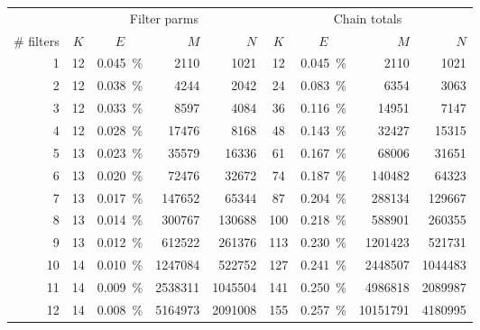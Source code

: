 \begin{tabular}{ r | c c r r | c c r r }
    \hline
    \rowcolor{blue!20}            & \multicolumn{4}{c}{Filter parms} & \multicolumn{4}{c}{Chain totals} \\
    \rowcolor{blue!20} \# filters & $K$ & $E$ & $M$ & $N$            & $K$ & $E$ & $M$ & $N$ \\
    \hline
    \rowcolor[gray]{0.925}
    \num{1} & \num{12} & \SI{0.045}{\%} & \num{2110} & \num{1021} & \num{12} & \SI{0.045}{\%} & \num{2110} & \num{1021} \\
    \num{2} & \num{12} & \SI{0.038}{\%} & \num{4244} & \num{2042} & \num{24} & \SI{0.083}{\%} & \num{6354} & \num{3063} \\
    \rowcolor[gray]{0.925}
    \num{3} & \num{12} & \SI{0.033}{\%} & \num{8597} & \num{4084} & \num{36} & \SI{0.116}{\%} & \num{14951} & \num{7147} \\
    \num{4} & \num{12} & \SI{0.028}{\%} & \num{17476} & \num{8168} & \num{48} & \SI{0.143}{\%} & \num{32427} & \num{15315} \\
    \rowcolor[gray]{0.925}
    \num{5} & \num{13} & \SI{0.023}{\%} & \num{35579} & \num{16336} & \num{61} & \SI{0.167}{\%} & \num{68006} & \num{31651} \\
    \num{6} & \num{13} & \SI{0.020}{\%} & \num{72476} & \num{32672} & \num{74} & \SI{0.187}{\%} & \num{140482} & \num{64323} \\
    \rowcolor[gray]{0.925}
    \num{7} & \num{13} & \SI{0.017}{\%} & \num{147652} & \num{65344} & \num{87} & \SI{0.204}{\%} & \num{288134} & \num{129667} \\
    \num{8} & \num{13} & \SI{0.014}{\%} & \num{300767} & \num{130688} & \num{100} & \SI{0.218}{\%} & \num{588901} & \num{260355} \\
    \rowcolor[gray]{0.925}
    \num{9} & \num{13} & \SI{0.012}{\%} & \num{612522} & \num{261376} & \num{113} & \SI{0.230}{\%} & \num{1201423} & \num{521731} \\
    \num{10} & \num{14} & \SI{0.010}{\%} & \num{1247084} & \num{522752} & \num{127} & \SI{0.241}{\%} & \num{2448507} & \num{1044483} \\
    \rowcolor[gray]{0.925}
    \num{11} & \num{14} & \SI{0.009}{\%} & \num{2538311} & \num{1045504} & \num{141} & \SI{0.250}{\%} & \num{4986818} & \num{2089987} \\
    \num{12} & \num{14} & \SI{0.008}{\%} & \num{5164973} & \num{2091008} & \num{155} & \SI{0.257}{\%} & \num{10151791} & \num{4180995} \\

\end{tabular}
